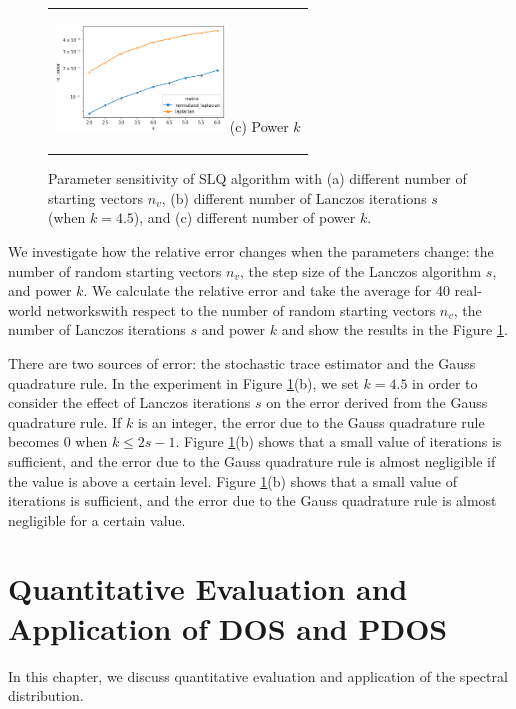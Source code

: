 \documentclass[senior,final,11pt]{iscs-thesis}
\begin{document}
\begin{figure}[htbp]
\begin{center}
\begin{tabular}{c}
\begin{minipage}{0.33\hsize}
          \begin{center}
            \includegraphics[clip, width=4.5cm]{./figure/plot_param_k.png}
            \hspace{1.6cm} (c) Power $k$
          \end{center}
        \end{minipage}
      \end{tabular}
      \caption{Parameter sensitivity of SLQ algorithm with (a) different number of starting vectors $n_v$, (b) different number of Lanczos iterations $s$ (when $k=4.5$), and (c) different number of power $k$. }
      \label{fig:param_sensitivity}
    \end{center}
  \end{figure}

We investigate how the relative error changes when the parameters change: the number of random starting vectors $n_v$, the step size of the Lanczos algorithm $s$, and power $k$. We calculate the relative error and take the average for 40 real-world networkswith respect to the number of random starting vectors $n_v$, the number of Lanczos iterations $s$ and power $k$ and show the results in the Figure \ref{fig:param_sensitivity}.

There are two sources of error: the stochastic trace estimator and the Gauss quadrature rule. In the experiment in Figure \ref{fig:param_sensitivity}(b), we set $k=4.5$ in order to consider the effect of Lanczos iterations $s$ on the error derived from the Gauss quadrature rule. If $k$ is an integer, the error due to the Gauss quadrature rule becomes 0 when $k \leq 2s-1$. Figure \ref{fig:param_sensitivity}(b) shows that a small value of iterations is sufficient, and the error due to the Gauss quadrature rule is almost negligible if the value is above a certain level. Figure \ref{fig:param_sensitivity}(b) shows that a small value of iterations is sufficient, and the error due to the Gauss quadrature rule is almost negligible for a certain value.




\chapter{Quantitative Evaluation and Application of DOS and PDOS}
In this chapter, we discuss quantitative evaluation and application of the spectral distribution.
\end{document}
